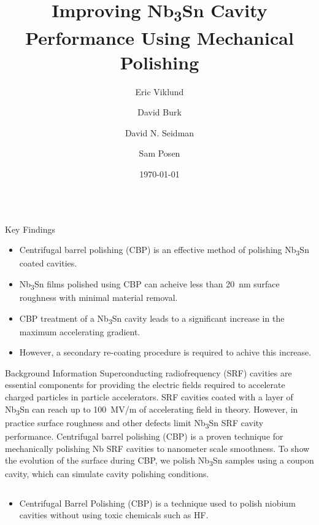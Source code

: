 \documentclass{beamer}
\title{Improving Nb\textsubscript{3}Sn Cavity Performance Using Mechanical Polishing}%
\author{Eric Viklund \inst{1, 2} \and David Burk \inst{2} \and David N. Seidman \inst{1} \and Sam Posen \inst{2}}
\institute[shortinst]{\inst{1} Department of Materials Science and Engineering, Northwestern University \samelineand \inst{2} Fermi National Accelerator Laboratory}
\date{\today}%
\begin{document}
%
    \begin{frame}{}
        \begin{columns}[t]
            \begin{column}{0.32\linewidth}
                \begin{alertblock}{\label{sec:introduction}Key Findings}
                    \begin{itemize}
                        \item Centrifugal barrel polishing (CBP) is an effective method of polishing Nb\textsubscript{3}Sn coated cavities.
                        \item Nb\textsubscript{3}Sn films polished using CBP can acheive less than 20~nm surface roughness with minimal material removal.
                        \item CBP treatment of a Nb\textsubscript{3}Sn cavity leads to a significant increase in the maximum accelerating gradient.
                        \item However, a secondary re-coating procedure is required to achive this increase.
                    \end{itemize}
                \end{alertblock}
                \begin{block}{\label{sec:backgroundinformation}Background Information}
                    Superconducting radiofrequency (SRF) cavities are essential components for providing the electric fields required to accelerate charged particles in particle accelerators. SRF cavities coated with a layer of Nb\textsubscript{3}Sn can reach up to 100~MV/m of accelerating field in theory. However, in practice surface roughness and other defects limit Nb\textsubscript{3}Sn SRF cavity performance. Centrifugal barrel polishing (CBP) is a proven technique for mechanically polishing Nb SRF cavities to nanometer scale smoothness. To show the evolution of the surface during CBP, we polish Nb\textsubscript{3}Sn samples using a coupon cavity, which can simulate cavity polishing conditions.
                    \begin{columns}[t]
                        \begin{column}{0.45\columnwidth}
                            \begin{itemize}
                                \item Centrifugal Barrel Polishing (CBP) is a technique used to polish niobium cavities without using toxic chemicals such as HF.

\end{itemize}
\end{column}
\end{columns}
\end{block}
\end{column}
\end{columns}
\end{frame}
\end{document}
